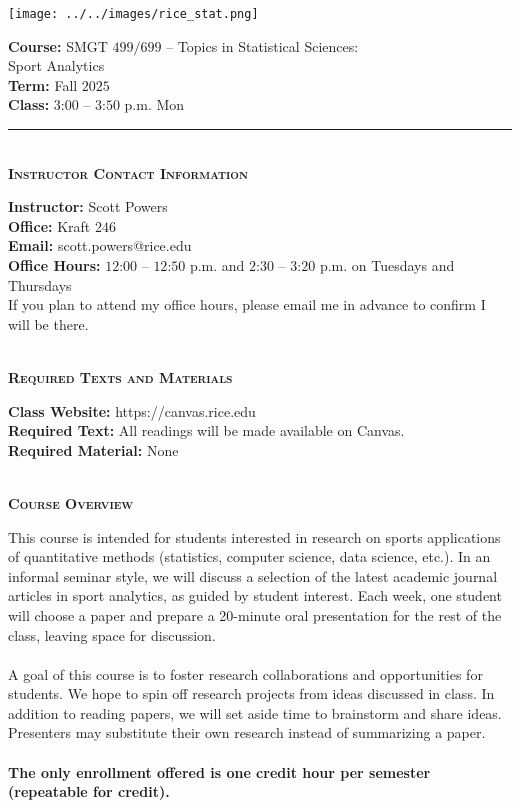 \documentclass[11pt]{article}
\begin{document}
\begin{minipage}[c]{0.4\linewidth}
  \texttt{[image: ../../images/rice\_stat.png]}
\end{minipage}
\begin{minipage}[c]{0.6\linewidth}
  \raggedleft
  {\bf Course:} SMGT $499/699$ -- Topics in Statistical Sciences:\\
  Sport Analytics\\
  {\bf Term:} Fall $2025$\\
  {\bf Class:} $3$:$00$ -- $3$:$50$ p.m. Mon
\end{minipage}

\hrule

~\\
\textbf{\textsc{Instructor Contact Information}}
\begin{adjustwidth}{1cm}{0cm}
	{\bf Instructor:} Scott Powers\\
  {\bf Office:} Kraft $246$\\
  {\bf Email:} scott.powers@rice.edu\\
  {\bf Office Hours:} $12$:$00$ -- $12$:$50$ p.m. and $2$:$30$ -- $3$:$20$ p.m. on Tuesdays and Thursdays\\
  If you plan to attend my office hours, please email me in advance to confirm I will be there.
\end{adjustwidth}

~\\
\textbf{\textsc{Required Texts and Materials}}
\begin{adjustwidth}{1cm}{0cm}
	{\bf Class Website:} https://canvas.rice.edu\\
	{\bf Required Text:} All readings will be made available on Canvas.\\
	{\bf Required Material:} None
\end{adjustwidth}

~\\
\textbf{\textsc{Course Overview}}
\begin{adjustwidth}{1cm}{0cm}
  This course is intended for students interested in research on sports applications of quantitative methods (statistics, computer science, data science, etc.). In an informal seminar style, we will discuss a selection of the latest academic journal articles in sport analytics, as guided by student interest. Each week, one student will choose a paper and prepare a 20-minute oral presentation for the rest of the class, leaving space for discussion.\\
  ~\\
  A goal of this course is to foster research collaborations and opportunities for students. We hope to spin off research projects from ideas discussed in class. In addition to reading papers, we will set aside time to brainstorm and share ideas. Presenters may substitute their own research instead of summarizing a paper.\\
  ~\\
  {\bf The only enrollment offered is one credit hour per semester (repeatable for credit).}
\end{adjustwidth}
\end{document}
